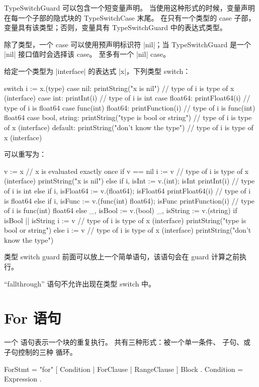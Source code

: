 TypeSwitchGuard 可以包含一个短变量声明。
当使用这种形式的时候，变量声明在每一个子部的隐式块的 TypeSwitchCase 末尾。
在只有一个类型的 case 子部，变量具有该类型；否则，变量具有 TypeSwitchGuard 中的表达式类型。

除了类型，一个 case 可以使用预声明标识符 \code|nil|；当 TypeSwitchGuard 是一个 \code|nil| 接口值时会选择该 case。
至多有一个 \code|nil| case。

给定一个类型为 \code|interface{}| 的表达式 \code|x|，下列类型 switch：
\begin{goblock}
switch i := x.(type) {
case nil:
	printString("x is nil")                // type of i is type of x (interface{})
case int:
	printInt(i)                            // type of i is int
case float64:
	printFloat64(i)                        // type of i is float64
case func(int) float64:
	printFunction(i)                       // type of i is func(int) float64
case bool, string:
	printString("type is bool or string")  // type of i is type of x (interface{})
default:
	printString("don't know the type")     // type of i is type of x (interface{})
}
\end{goblock}
可以重写为：
\begin{goblock}
v := x  // x is evaluated exactly once
if v == nil {
	i := v                                 // type of i is type of x (interface{})
	printString("x is nil")
} else if i, isInt := v.(int); isInt {
	printInt(i)                            // type of i is int
} else if i, isFloat64 := v.(float64); isFloat64 {
	printFloat64(i)                        // type of i is float64
} else if i, isFunc := v.(func(int) float64); isFunc {
	printFunction(i)                       // type of i is func(int) float64
} else {
	_, isBool := v.(bool)
	_, isString := v.(string)
	if isBool || isString {
		i := v                         // type of i is type of x (interface{})
		printString("type is bool or string")
	} else {
		i := v                         // type of i is type of x (interface{})
		printString("don't know the type")
	}
}
\end{goblock}

类型 switch guard 前面可以放上一个简单语句，该语句会在 guard 计算之前执行。

``fallthrough'' 语句不允许出现在类型 switch 中。

\section{For 语句}\label{sec:for}
一个  语句表示一个块的重复执行。
共有三种形式：被一个单一条件、 子句、或  子句控制的三种  循环。
\begin{EBNF}
ForStmt = "for" [ Condition | ForClause | RangeClause ] Block .
Condition = Expression .
\end{EBNF}

